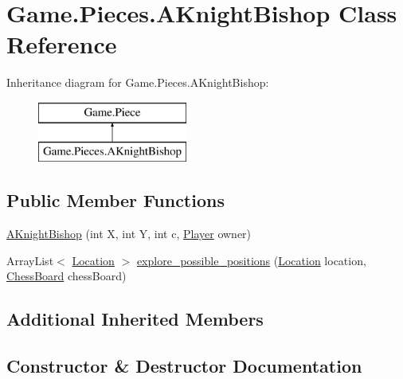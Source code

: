 \hypertarget{class_game_1_1_pieces_1_1_a_knight_bishop}{}\section{Game.\+Pieces.\+A\+Knight\+Bishop Class Reference}
\label{class_game_1_1_pieces_1_1_a_knight_bishop}
Inheritance diagram for Game.\+Pieces.\+A\+Knight\+Bishop\+:\begin{figure}[H]
\begin{center}
\leavevmode
\includegraphics[height=2.000000cm]{class_game_1_1_pieces_1_1_a_knight_bishop}
\end{center}
\end{figure}
\subsection*{Public Member Functions}
\begin{DoxyCompactItemize}
\item 
\hyperlink{class_game_1_1_pieces_1_1_a_knight_bishop_a687eef276ded4074c834802d826f729c}{A\+Knight\+Bishop} (int X, int Y, int c, \hyperlink{class_game_1_1_player}{Player} owner)
\item 
Array\+List$<$ \hyperlink{class_game_1_1_location}{Location} $>$ \hyperlink{class_game_1_1_pieces_1_1_a_knight_bishop_a5f32dd9226cfeef33dabefbe0b26f415}{explore\+\_\+possible\+\_\+positions} (\hyperlink{class_game_1_1_location}{Location} location, \hyperlink{class_game_1_1_chess_board}{Chess\+Board} chess\+Board)
\end{DoxyCompactItemize}
\subsection*{Additional Inherited Members}


\subsection{Constructor \& Destructor Documentation}
\mbox{\label{class_game_1_1_pieces_1_1_a_knight_bishop_a687eef276ded4074c834802d826f729c}} 

